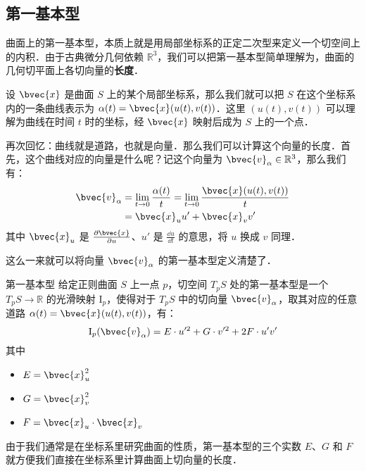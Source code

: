 
\subsection{第一基本型}

曲面上的第一基本型，本质上就是用局部坐标系的正定二次型来定义一个切空间上的内积．由于古典微分几何依赖 $\mathbb{R}^3$，我们可以把第一基本型简单理解为，曲面的几何切平面上各切向量的\textbf{长度}．

设 $\bvec{x}$ 是曲面 $S$ 上的某个局部坐标系，那么我们就可以把 $S$ 在这个坐标系内的一条曲线表示为 $\alpha(t)=\bvec{x}(u(t), v(t))$．这里 $(u(t), v(t))$ 可以理解为曲线在时间 $t$ 时的坐标，经 $\bvec{x}$ 映射后成为 $S$ 上的一个点．

再次回忆：曲线就是道路，也就是向量．那么我们可以计算这个向量的长度．首先，这个曲线对应的向量是什么呢？记这个向量为 $\bvec{v}_\alpha\in\mathbb{R}^3$，那么我们有：
\begin{equation}
\begin{aligned}
\bvec{v}_\alpha&=\lim\limits_{t\to 0}\frac{\alpha(t)}{t}=\lim\limits_{t\to 0}\frac{\bvec{x}(u(t), v(t))}{t}\\
&=\bvec{x}_uu'+\bvec{x}_vv'
\end{aligned}
\end{equation}
其中 $\bvec{x}_u$ 是 $\frac{\partial\bvec{x}}{\partial u}$、$u'$ 是 $\frac{\dd u}{\dd t}$ 的意思，将 $u$ 换成 $v$ 同理．

这么一来就可以将向量 $\bvec{v}_\alpha$ 的第一基本型定义清楚了．

\begin{definition}{第一基本型}\label{FForm_def1}
给定正则曲面 $S$ 上一点 $p$，切空间 $T_pS$ 处的第一基本型是一个 $T_pS\to \mathbb{R}$ 的光滑映射 $\mathrm{I}_p$，使得对于 $T_pS$ 中的切向量 $\bvec{v}_\alpha$，取其对应的任意道路 $\alpha(t)=\bvec{x}(u(t), v(t))$，有：$$\mathrm{I}_p(\bvec{v}_\alpha)=E\cdot u'^2+G\cdot v'^2+ 2F\cdot u'v'$$
其中
\begin{itemize}
\item $E=\bvec{x}_u^2$
\item $G=\bvec{x}_v^2$
\item $F=\bvec{x}_u\cdot\bvec{x}_v$
\end{itemize}
\end{definition}

由于我们通常是在坐标系里研究曲面的性质，第一基本型的三个实数 $E$、$G$ 和 $F$ 就方便我们直接在坐标系里计算曲面上切向量的长度．


